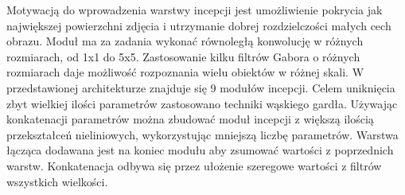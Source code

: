 \documentclass[12pt,a4paper,twoside,titlepage,openright]{book}
\begin{document}
Motywacją do wprowadzenia warstwy incepcji jest umożliwienie pokrycia jak największej powierzchni zdjęcia i utrzymanie dobrej rozdzielczości małych cech obrazu. Moduł ma za zadania wykonać równoległą konwolucję w różnych rozmiarach, od 1x1 do 5x5. Zastosowanie kilku filtrów Gabora o różnych rozmiarach daje możliwość rozpoznania wielu obiektów w różnej skali. W przedstawionej architekturze znajduje się 9 modułów incepcji. Celem uniknięcia zbyt wielkiej ilości parametrów zastosowano techniki wąskiego gardła. Używając konkatenacji parametrów można zbudować moduł incepcji z większą ilością przekształceń nieliniowych, wykorzystując mniejszą liczbę parametrów. Warstwa łącząca dodawana jest na koniec modułu aby zsumować wartości z poprzednich warstw. Konkatenacja odbywa się przez ułożenie szeregowe wartości z filtrów wszystkich wielkości.



\cite{DBLP:journals/corr/SzegedyLJSRAEVR14}
\end{document}
